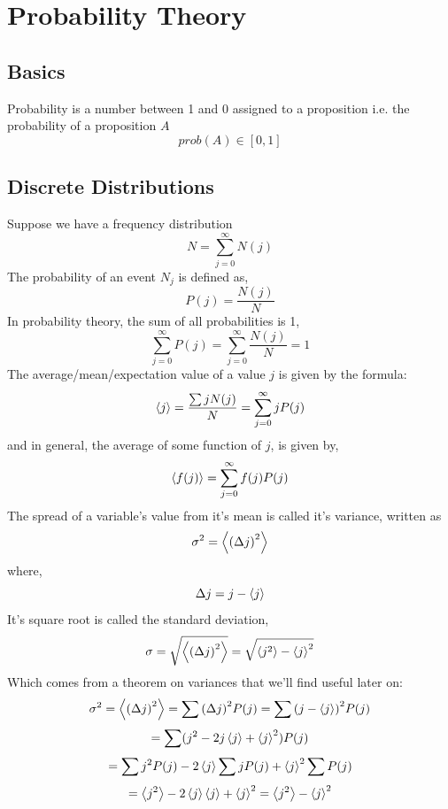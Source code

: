 \section{Probability Theory}
\subsection{Basics}
Probability is a number between 1 and 0 assigned to a proposition i.e. the probability of a proposition $A$
\begin{equation}
    prob(A) \in [0,1]
\end{equation}

\subsection{Discrete Distributions}
Suppose we have a frequency distribution 
\begin{equation}
N = \sum_{j=0}^{\infty} N(j)
\end{equation}
The probability of an event $N_{j}$ is defined as,
\begin{equation}
P(j) = \frac{N(j)}{N}
\end{equation}
In probability theory, the sum of all probabilities is 1,
\begin{equation}
\sum_{j = 0}^{\infty}P(j) = \sum_{j = 0}^{\infty}\frac{N(j)}{N} = 1
\end{equation}
The average/mean/expectation value of a value $j$ is given by the formula:
\begin{equation}
	\expval{j} = \frac{\sum j N(j)}{N} = \sum_{j =0 }^{\infty} j P(j)
\end{equation}
and in general, the average of some function of $j$, is given by,
\begin{equation}
\expval{f(j)} = \sum_{j =0 }^{\infty} f(j) P(j)
\end{equation}
The spread of a variable's value from it's mean is called it's variance, written as
\begin{equation}
\sigma^{2} = \expval{{(\Delta j)}^{2}}
\end{equation}
where,
$$\Delta j = j - \expval{j}$$
It's square root is called the standard deviation,
\begin{equation}
\sigma = \sqrt{\expval{{(\Delta j)}^{2}}} =  \sqrt{\expval{j^{2}} - \expval{j}^{2}}
\end{equation}
Which comes from a theorem on variances that we'll find useful later on:
$$\sigma^{2} = \expval{{(\Delta j)}^{2}} = \sum {(\Delta j)}^{2} P(j) = \sum {(j- \expval{j})}^{2} P(j)$$
$$ = \sum (j^{2} - 2j \expval{j} + \expval{j}^{2}) P(j)$$
$$ = \sum j^{2}P(j) - 2 \expval{j} \sum jP(j) + \expval{j}^{2}\sum P(j)$$
$$ = \expval{j^{2}} - 2 \expval{j}\expval{j} + \expval{j}^{2} = \expval{j^{2}} - \expval{j}^{2}$$
